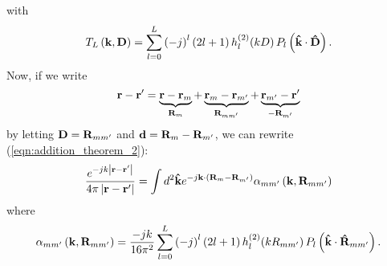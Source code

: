 with
\begin{equation}
T_L\left(\mathbf{k}, \mathbf{D} \right) = \sum_{l = 0}^L \left(-j\right)^l \left(2l+1 \right) h_l^{(2)}\! \left(k D\right) P_l\left(\mathbf{\hat{k}} \cdot \mathbf{\hat{D}} \right).
\end{equation}
Now, if we write 
\begin{equation}\label{eqn:r_rprime}
\mathbf{r} - \mathbf{r}' = \underbrace{\mathbf{r} - \mathbf{r}_m}_{\mathbf{R}_{m}} + \underbrace{\mathbf{r}_m - \mathbf{r}_{m'}}_{\mathbf{R}_{mm'}} + \underbrace{\mathbf{r}_{m'} - \mathbf{r}'}_{-\mathbf{R}_{m'}}
\end{equation}
by letting $\mathbf{D} = \mathbf{R}_{mm'}$ and $\mathbf{d} = \mathbf{R}_{m} - \mathbf{R}_{m'}$, we can rewrite (\ref{eqn:addition_theorem_2}):
\begin{equation}\label{eqn:addition_theorem_3}
\frac{e^{-jk \left|\mathbf{r} - \mathbf{r}'  \right|}}{4 \pi \left|\mathbf{r} - \mathbf{r}' \right|} = \int d^2\mathbf{\hat{k}} e^{-j\mathbf{k} \cdot \left( \mathbf{R}_{m} - \mathbf{R}_{m'} \right)} \alpha_{mm'}\left(\mathbf{k}, \mathbf{R}_{mm'} \right)
\end{equation}
where
\begin{equation}
\alpha_{mm'}\left(\mathbf{k}, \mathbf{R}_{mm'} \right) = \frac{-jk}{16 \pi^2} \sum_{l = 0}^L \left(-j\right)^l \left(2l+1 \right) h_l^{(2)}\! \left(k R_{mm'}\right) P_l\left(\mathbf{\hat{k}} \cdot \mathbf{\hat{R}}_{mm'} \right).
\end{equation}


